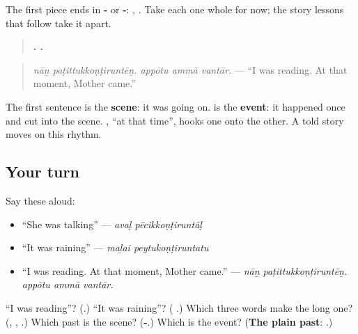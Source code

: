 The first piece ends in \textbf{-} or \textbf{-}: \textbf{}, \textbf{}. Take each one whole for now; the story lessons that follow take it apart.

\begin{grammarlens}[title={Grammar Lens: the scene and the event}]
\begin{quote}
\textbf{ .   .}
\end{quote}

\begin{quote}
\emph{nāṉ paṭittukkoṇṭiruntēṉ. appōtu ammā vantār.} — \textquotedblleft{}I was reading. At that moment, Mother came.\textquotedblright{}
\end{quote}

The first sentence is the \textbf{scene}: it was going on. \textbf{} is the \textbf{event}: it happened once and cut into the scene. \textbf{}, \textquotedblleft{}at that time\textquotedblright{}, hooks one onto the other. A told story moves on this rhythm.
\end{grammarlens}

\subsection*{Your turn}
Say these aloud:

\begin{itemize}
\raggedright
  \item \textquotedblleft{}She was talking\textquotedblright{} — \emph{avaḷ pēcikkoṇṭiruntāḷ}
  \item \textquotedblleft{}It was raining\textquotedblright{} — \emph{maḻai peytukoṇṭiruntatu}
  \item \textquotedblleft{}I was reading. At that moment, Mother came.\textquotedblright{} — \emph{nāṉ paṭittukkoṇṭiruntēṉ. appōtu ammā vantār.}
\end{itemize}

\begin{tcolorbox}[breakable,colback=teal!4,colframe=teal!35!black,title={Before you move on}]
\textquotedblleft{}I was reading\textquotedblright{}? (\textbf{}.) \textquotedblleft{}It was raining\textquotedblright{}? (\textbf{ }.) Which three words make the long one? (\textbf{}, \textbf{}, \textbf{}.) Which past is the scene? (\textbf{-}.) Which is the event? (\textbf{The plain past}: \textbf{}.)
\end{tcolorbox}
